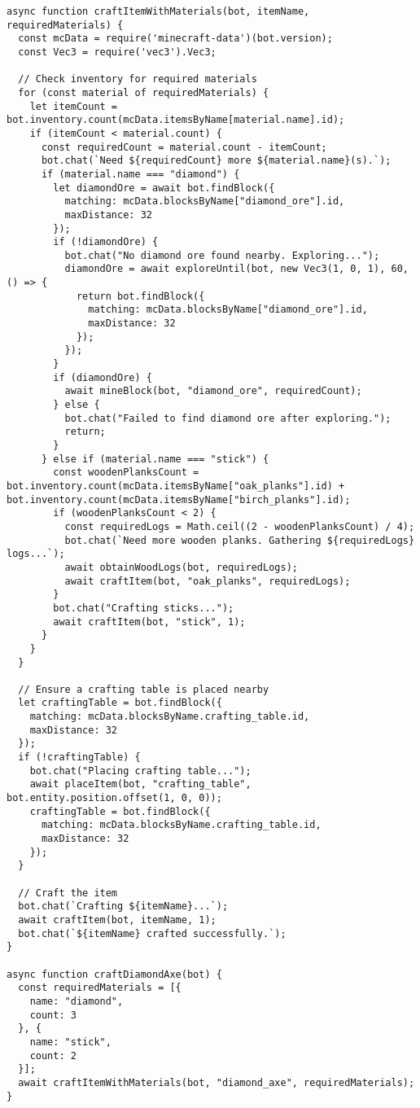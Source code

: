\begin{tcolorbox}[title=CraftItemWithMaterials, width=\textwidth,top=0mm,  breakable]
\begin{Verbatim}[breaklines=true, breakanywhere=true, fontsize=\footnotesize]
async function craftItemWithMaterials(bot, itemName, requiredMaterials) {
  const mcData = require('minecraft-data')(bot.version);
  const Vec3 = require('vec3').Vec3;

  // Check inventory for required materials
  for (const material of requiredMaterials) {
    let itemCount = bot.inventory.count(mcData.itemsByName[material.name].id);
    if (itemCount < material.count) {
      const requiredCount = material.count - itemCount;
      bot.chat(`Need ${requiredCount} more ${material.name}(s).`);
      if (material.name === "diamond") {
        let diamondOre = await bot.findBlock({
          matching: mcData.blocksByName["diamond_ore"].id,
          maxDistance: 32
        });
        if (!diamondOre) {
          bot.chat("No diamond ore found nearby. Exploring...");
          diamondOre = await exploreUntil(bot, new Vec3(1, 0, 1), 60, () => {
            return bot.findBlock({
              matching: mcData.blocksByName["diamond_ore"].id,
              maxDistance: 32
            });
          });
        }
        if (diamondOre) {
          await mineBlock(bot, "diamond_ore", requiredCount);
        } else {
          bot.chat("Failed to find diamond ore after exploring.");
          return;
        }
      } else if (material.name === "stick") {
        const woodenPlanksCount = bot.inventory.count(mcData.itemsByName["oak_planks"].id) + bot.inventory.count(mcData.itemsByName["birch_planks"].id);
        if (woodenPlanksCount < 2) {
          const requiredLogs = Math.ceil((2 - woodenPlanksCount) / 4);
          bot.chat(`Need more wooden planks. Gathering ${requiredLogs} logs...`);
          await obtainWoodLogs(bot, requiredLogs);
          await craftItem(bot, "oak_planks", requiredLogs);
        }
        bot.chat("Crafting sticks...");
        await craftItem(bot, "stick", 1);
      }
    }
  }

  // Ensure a crafting table is placed nearby
  let craftingTable = bot.findBlock({
    matching: mcData.blocksByName.crafting_table.id,
    maxDistance: 32
  });
  if (!craftingTable) {
    bot.chat("Placing crafting table...");
    await placeItem(bot, "crafting_table", bot.entity.position.offset(1, 0, 0));
    craftingTable = bot.findBlock({
      matching: mcData.blocksByName.crafting_table.id,
      maxDistance: 32
    });
  }

  // Craft the item
  bot.chat(`Crafting ${itemName}...`);
  await craftItem(bot, itemName, 1);
  bot.chat(`${itemName} crafted successfully.`);
}

async function craftDiamondAxe(bot) {
  const requiredMaterials = [{
    name: "diamond",
    count: 3
  }, {
    name: "stick",
    count: 2
  }];
  await craftItemWithMaterials(bot, "diamond_axe", requiredMaterials);
}
\end{Verbatim}
\end{tcolorbox}


